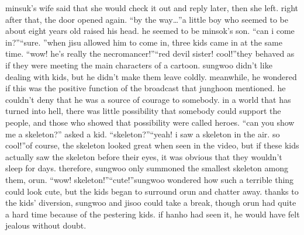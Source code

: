 minsuk’s wife said that she would check it out and reply later, then she left.
right after that, the door opened again.
“by the way…”a little boy who seemed to be about eight years old raised his head.
 he seemed to be minsok’s son.
“can i come in?”“sure.
”when jisu allowed him to come in, three kids came in at the same time.
“wow! he’s really the necromancer!”“red devil sister! cool!”they behaved as if they were meeting the main characters of a cartoon.
 sungwoo didn’t like dealing with kids, but he didn’t make them leave coldly.
meanwhile, he wondered if this was the positive function of the broadcast that junghoon mentioned.
 he couldn’t deny that he was a source of courage to somebody.
in a world that has turned into hell, there was little possibility that somebody could support the people, and those who showed that possibility were called heroes.
“can you show me a skeleton?” asked a kid.
“skeleton?”“yeah! i saw a skeleton in the air.
 so cool!”of course, the skeleton looked great when seen in the video, but if these kids actually saw the skeleton before their eyes, it was obvious that they wouldn’t sleep for days.
therefore, sungwoo only summoned the smallest skeleton among them, orun.
“wow! skeleton!”“cute!”sungwoo wondered how such a terrible thing could look cute, but the kids began to surround orun and chatter away.
thanks to the kids’ diversion, sungwoo and jisoo could take a break, though orun had quite a hard time because of the pestering kids.
if hanho had seen it, he would have felt jealous without doubt.


 
